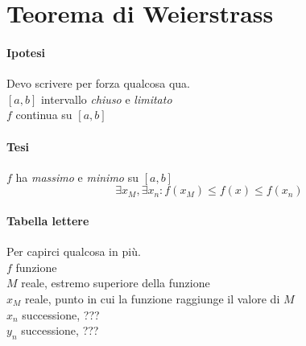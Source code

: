 \documentclass{article}
\begin{document}
\section{Teorema di Weierstrass}

\paragraph{Ipotesi}
\footnotesize Devo scrivere per forza qualcosa qua.\\\normalsize
\([a, b]\) intervallo \textit{chiuso} e \textit{limitato}\\
\(f\) continua su \([a, b]\)

\paragraph{Tesi}
\(f\) ha \textit{massimo} e \textit{minimo} su \([ a, b ]\)\\
\[\exists x_M, \exists x_n : f(x_M) \leq f(x) \leq f(x_n)\]

\paragraph{Tabella lettere}
\footnotesize Per capirci qualcosa in più.\\\normalsize
\(f\) \quad funzione\\
\(M\) \quad reale, estremo superiore della funzione\\
\(x_M\) \quad reale, punto in cui la funzione raggiunge il valore di \(M\)\\
\(x_n\) \quad successione, ???\\
\(y_n\) \quad successione, ???
\end{document}

